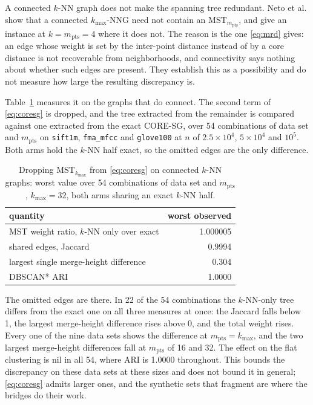 \documentclass{ieeeaccess}
\newcommand{\kmax}{k_{\max}}
\newcommand{\mpts}{m_{\mathrm{pts}}}
\begin{document}
A connected $k$-NN graph does not make the spanning tree redundant. Neto et al.
\cite{coresg} show that a connected $\kmax$-NNG need not contain an
$\mathrm{MST}_{\mpts}$, and give an instance at $k = \mpts = 4$ where it does
not. The reason is the one \eqref{eq:mrd} gives: an edge whose weight is set by
the inter-point distance instead of by a core distance is not recoverable from
neighborhoods, and connectivity says nothing about whether such edges are
present. They establish this as a possibility and do not measure how large the
resulting discrepancy is.

Table~\ref{tab:knnonly} measures it on the graphs that do connect. The second
term of \eqref{eq:coresg} is dropped, and the tree extracted from the remainder
is compared against one extracted from the exact CORE-SG, over 54 combinations of
data set and $\mpts$ on \texttt{sift1m}, \texttt{fma\_mfcc} and
\texttt{glove100} at $n$ of $2.5\times10^4$, $5\times10^4$ and $10^5$. Both arms
hold the $k$-NN half exact, so the omitted edges are the only difference.

\begin{table}[!t]
\caption{Dropping $\mathrm{MST}_{\kmax}$ from \eqref{eq:coresg} on connected
$k$-NN graphs: worst value over 54 combinations of data set and $\mpts$,
$\kmax = 32$, both arms sharing an exact $k$-NN half.}
\label{tab:knnonly}
\centering
\footnotesize
\begin{tabular}{@{}lr@{}}
\toprule
quantity & worst observed \\
\midrule
MST weight ratio, $k$-NN only over exact & 1.000005 \\
shared edges, Jaccard                    & 0.9994 \\
largest single merge-height difference   & 0.304 \\
DBSCAN* ARI                              & 1.0000 \\
\bottomrule
\end{tabular}
\end{table}

The omitted edges are there. In 22 of the 54 combinations the $k$-NN-only tree
differs from the exact one on all three measures at once: the Jaccard falls below
1, the largest merge-height difference rises above 0, and the total weight rises.
Every one of the nine data sets shows the difference at $\mpts = \kmax$, and the
two largest merge-height differences fall at $\mpts$ of 16 and 32. The effect on
the flat clustering is nil in all 54, where ARI is 1.0000 throughout. This bounds
the discrepancy on these data sets at these sizes and does not bound it in
general; \eqref{eq:coresg} admits larger ones, and the synthetic sets that
fragment are where the bridges do their work.
\end{document}
